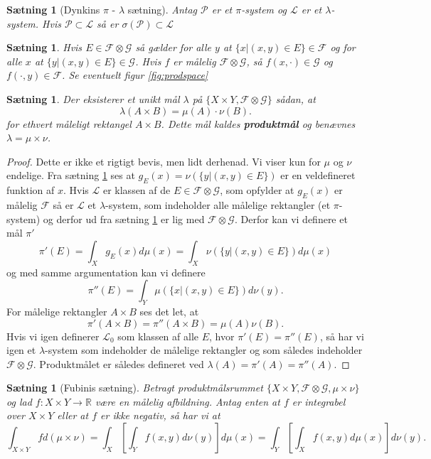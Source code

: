 \documentclass[12pt]{report}
\newtheorem{theorem}[lemma]{Sætning}
\theoremstyle{break}
\newtheorem*{proof}{Bevis}
\theoremstyle{break}
\newcommand{\RR}{\mathbb{R}}
\newcommand{\G}{\mathcal{G}}
\newcommand{\FI}{\mathcal{F}}
\newcommand{\PI}{\mathcal{P}}
\renewcommand{\L}{\mathcal{L}}
\begin{document}
\begin{theorem}[Dynkins $\pi$ - $\lambda$ sætning]\label{th:dynkin}
	Antag $\PI$ er et $\pi$-system og $\L$ er et $\lambda$-system. Hvis $\PI \subset \L$ så er $\sigma(\PI)\subset\L$
\end{theorem}
\begin{theorem}\label{th:s2}
	Hvis $E\in \FI \otimes \G$ så gælder for alle $y$ at $\{ x|(x,y)\in E \}\in \FI$ og for alle $x$ at $\{ y|(x,y)\in E \}\in \G$. Hvis $f$ er målelig $\FI \otimes \G$, så $f(x,\cdot)\in \G$ og $f(\cdot,y)\in \FI$. Se eventuelt figur \ref{fig:prodspace}
\end{theorem}
\begin{theorem}
	Der eksisterer et unikt mål $\lambda$ på $\{ X \times Y, \FI \otimes \G \}$ sådan, at
	\[ \lambda(A\times B)=\mu(A)\cdot\nu(B). \]
	for ethvert måleligt rektangel $A \times B$. Dette mål kaldes {\bf produktmål} og benævnes $\lambda=\mu\times\nu$.
\end{theorem}
\begin{proof}
	Dette er ikke et rigtigt bevis, men lidt derhenad. Vi viser kun for $\mu$ og $\nu$ endelige. Fra sætning \ref{th:s2} ses at $g_E(x)=\nu (\{ y|(x,y)\in E \})$ er en veldefineret funktion af $x$. Hvis $\L$ er klassen af de $E\in \FI \otimes \G$, som opfylder at $g_E(x)$ er målelig $\FI$ så er $\L$ et $\lambda$-system, som indeholder alle målelige rektangler (et $\pi$-system) og derfor ud fra sætning \ref*{th:dynkin} er lig med $\FI \otimes \G$. Derfor kan vi definere et mål $\pi'$
	\[ \pi'(E)=\int_X g_E(x)d\mu(x)=\int_X \nu(\{ y|(x,y)\in E \})d\mu(x) \]
	og med samme argumentation kan vi definere
	\[ \pi''(E)=\int_Y \mu(\{ x|(x,y)\in E \})d\nu(y). \]
	For målelige rektangler $A\times B$ ses det let, at
	\[ \pi'(A\times B) = \pi''(A\times B) = \mu(A)\nu(B). \]
	Hvis vi igen definerer $\L_0$ som klassen af alle $E$, hvor $\pi'(E) =\pi''(E)$, så har vi igen et $\lambda$-system som indeholder de målelige rektangler og som således indeholder $\FI \otimes \G$. Produktmålet er således defineret ved $\lambda(A)=\pi'(A)=\pi''(A)$.
\end{proof}
\begin{theorem}[Fubinis sætning]
	Betragt produktmålsrummet $\{ X\times Y, \FI \otimes \G,\mu \times \nu \}$ og lad $f\colon X\times Y\to \RR$ være en målelig afbildning. Antag enten at $f$ er integrabel over $X\times Y$ eller at $f$ er ikke negativ, så har vi at
	\[ \int_{X\times Y}fd(\mu \times \nu)=\int_X \left[ \int_Y f(x,y)d\nu(y) \right]d\mu(x)=\int_Y\left[ \int_X f(x,y)d\mu(x) \right]d\nu(y). \]
\end{theorem}
\end{document}
